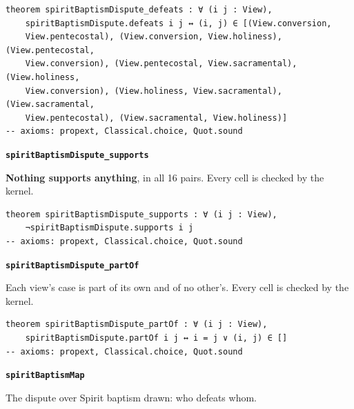 \documentclass[11pt]{article}
\begin{document}
{\small\begin{verbatim}
theorem spiritBaptismDispute_defeats : ∀ (i j : View),
    spiritBaptismDispute.defeats i j ↔ (i, j) ∈ [(View.conversion,
    View.pentecostal), (View.conversion, View.holiness), (View.pentecostal,
    View.conversion), (View.pentecostal, View.sacramental), (View.holiness,
    View.conversion), (View.holiness, View.sacramental), (View.sacramental,
    View.pentecostal), (View.sacramental, View.holiness)]
-- axioms: propext, Classical.choice, Quot.sound
\end{verbatim}}
\par\medskip\noindent\textbf{\texttt{spirit\allowbreak{}Baptism\allowbreak{}Dispute\_\allowbreak{}supports}}\par\nobreak\noindent
\textbf{Nothing supports anything}, in all 16 pairs. Every cell is checked by the kernel.

{\small\begin{verbatim}
theorem spiritBaptismDispute_supports : ∀ (i j : View),
    ¬spiritBaptismDispute.supports i j
-- axioms: propext, Classical.choice, Quot.sound
\end{verbatim}}
\par\medskip\noindent\textbf{\texttt{spirit\allowbreak{}Baptism\allowbreak{}Dispute\_\allowbreak{}part\allowbreak{}Of}}\par\nobreak\noindent
Each view’s case is part of its own and of no other’s. Every cell is checked by the kernel.

{\small\begin{verbatim}
theorem spiritBaptismDispute_partOf : ∀ (i j : View),
    spiritBaptismDispute.partOf i j ↔ i = j ∨ (i, j) ∈ []
-- axioms: propext, Classical.choice, Quot.sound
\end{verbatim}}
\par\medskip\noindent\textbf{\texttt{spirit\allowbreak{}Baptism\allowbreak{}Map}}\par\nobreak\noindent
The dispute over Spirit baptism drawn: who defeats whom.
\end{document}
